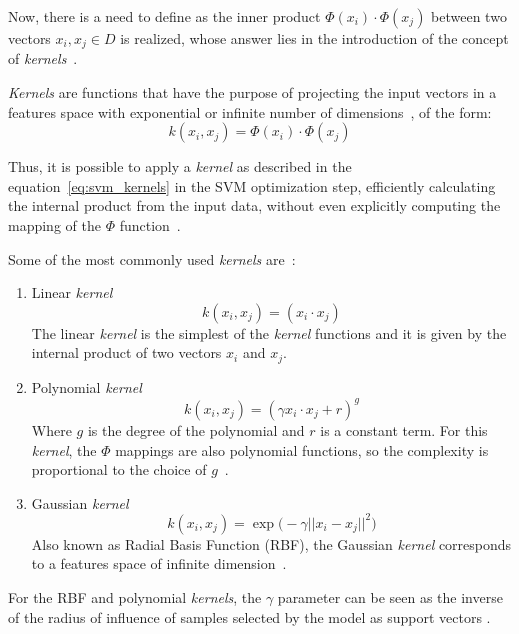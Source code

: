Now, there is a need to define as the inner product $\Phi(x_i) \cdot \Phi(x_j)$ between two vectors $x_i, x_j \in D$ is realized, whose answer lies in the introduction of the concept of \emph{kernels}~\citep{lorena:03}.

\emph{Kernels} are functions that have the purpose of projecting the input vectors in a features space with exponential or infinite number of dimensions~\citep{taylor:04}, of the form:
\begin{equation}
\label{eq:svm_kernels}
k(x_i, x_j) =  \Phi(x_i) \cdot \Phi(x_j)
\end{equation}

Thus, it is possible to apply a \emph{kernel} as described in the equation~\ref{eq:svm_kernels} in the SVM optimization step, efficiently calculating the internal product from the input data, without even explicitly computing the mapping of the $\Phi$ function~\citep{taylor:04}.

Some of the most commonly used \emph{kernels} are~\citep{lorena:03}:
\begin{enumerate}[label=(\roman*)]
\item Linear \emph{kernel}
\begin{equation}
\label{eq:svm_kernel_linear}
k(x_i, x_j) =  (x_i \cdot x_j)
\end{equation}
The linear \emph{kernel} is the simplest of the \emph{kernel} functions and it is given by the internal product of two vectors $x_i$ and $x_j$.

\item Polynomial \emph{kernel}
\begin{equation}
\label{eq:svm_kernel_polinomial}
k(x_i, x_j) =  ({\gamma x_i \cdot x_j + r} )^g
\end{equation}
Where $g$ is the degree of the polynomial and $r$ is a constant term. For this \emph{kernel}, the $\Phi$ mappings are also polynomial functions, so the complexity is proportional to the choice of $g$~\citep{lorena:03}.

\item Gaussian \emph{kernel}
\begin{equation}
\label{eq:svm_kernel_rbf}
k(x_i, x_j) =  \exp{\big(-\gamma {||x_i - x_j||}^2 \big)}
\end{equation}
Also known as Radial Basis Function (RBF), the Gaussian \emph{kernel} corresponds to a features space of infinite dimension~\citep{lorena:03}.

\end{enumerate}

For the RBF and polynomial \emph{kernels}, the $\gamma$ parameter can be seen as the inverse of the radius of influence of samples selected by the model as support vectors \citep{scikit-learn:11}.